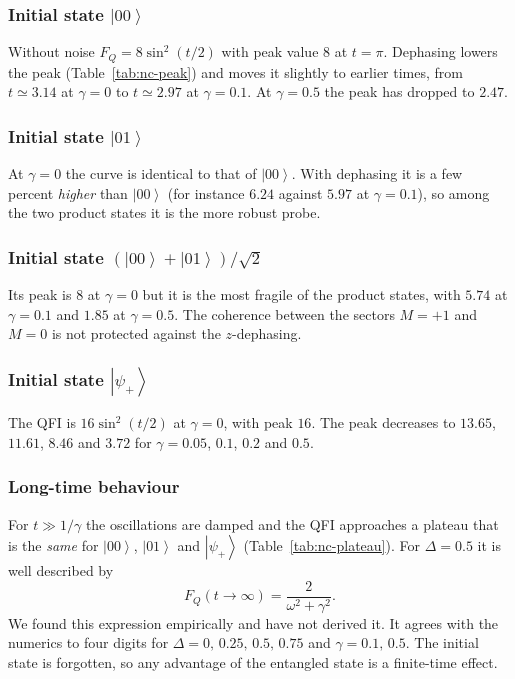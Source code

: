 \documentclass[11pt,a4paper]{article}
\newcommand{\ket}[1]{\left|#1\right\rangle}
\newcommand{\FQ}{F_Q}
\begin{document}
\begin{table}[htbp]
  \centering
  
  \caption{Maximum over $t\in[0,4\pi]$ of the QFI, for $V=S_x$, $J=1$, $\Delta=0.5$.}
  \label{tab:nc-peak}
\end{table}

\subsubsection{Initial state $\ket{00}$}
Without noise $\FQ=8\sin^2(t/2)$ with peak value $8$ at $t=\pi$. Dephasing lowers the peak (Table~\ref{tab:nc-peak}) and moves it slightly to earlier times, from $t\simeq3.14$ at $\gamma=0$ to $t\simeq2.97$ at $\gamma=0.1$. At $\gamma=0.5$ the peak has dropped to $2.47$.

\subsubsection{Initial state $\ket{01}$}
At $\gamma=0$ the curve is identical to that of $\ket{00}$. With dephasing it is a few percent \emph{higher} than $\ket{00}$ (for instance $6.24$ against $5.97$ at $\gamma=0.1$), so among the two product states it is the more robust probe.

\subsubsection{Initial state $(\ket{00}+\ket{01})/\sqrt2$}
Its peak is $8$ at $\gamma=0$ but it is the most fragile of the product states, with $5.74$ at $\gamma=0.1$ and $1.85$ at $\gamma=0.5$. The coherence between the sectors $M=+1$ and $M=0$ is not protected against the $z$-dephasing.

\subsubsection{Initial state $\ket{\psi_+}$}
The QFI is $16\sin^2(t/2)$ at $\gamma=0$, with peak $16$. The peak decreases to $13.65$, $11.61$, $8.46$ and $3.72$ for $\gamma=0.05$, $0.1$, $0.2$ and $0.5$.

\subsubsection{Long-time behaviour}
For $t\gg1/\gamma$ the oscillations are damped and the QFI approaches a plateau that is the \emph{same} for $\ket{00}$, $\ket{01}$ and $\ket{\psi_+}$ (Table~\ref{tab:nc-plateau}). For $\Delta=0.5$ it is well described by
\begin{equation}
  \FQ(t\to\infty)=\frac{2}{\omega^2+\gamma^2}.
\end{equation}
We found this expression empirically and have not derived it. It agrees with the numerics to four digits for $\Delta=0,\,0.25,\,0.5,\,0.75$ and $\gamma=0.1,\,0.5$. The initial state is forgotten, so any advantage of the entangled state is a finite-time effect.
\end{document}
